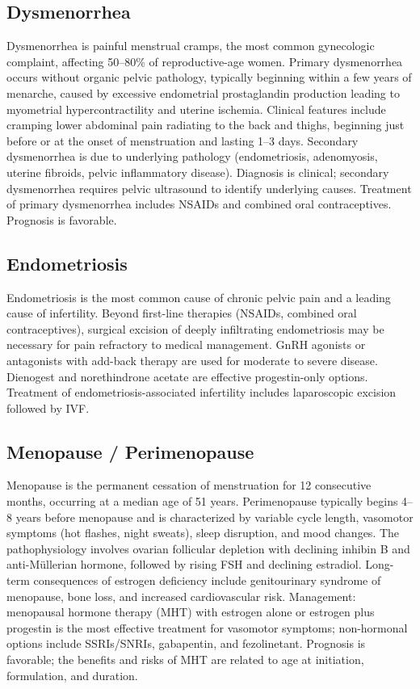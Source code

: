 \subsection{Dysmenorrhea}
\label{sec:Dysmenorrhea}
Dysmenorrhea is painful menstrual cramps, the most common gynecologic complaint, affecting 50--80\% of reproductive-age women. Primary dysmenorrhea occurs without organic pelvic pathology, typically beginning within a few years of menarche, caused by excessive endometrial prostaglandin production leading to myometrial hypercontractility and uterine ischemia. Clinical features include cramping lower abdominal pain radiating to the back and thighs, beginning just before or at the onset of menstruation and lasting 1--3 days. Secondary dysmenorrhea is due to underlying pathology (endometriosis, adenomyosis, uterine fibroids, pelvic inflammatory disease). Diagnosis is clinical; secondary dysmenorrhea requires pelvic ultrasound to identify underlying causes. Treatment of primary dysmenorrhea includes NSAIDs and combined oral contraceptives. Prognosis is favorable.

\subsection{Endometriosis}
\label{sec:obstetric:Endometriosis}
Endometriosis is the most common cause of chronic pelvic pain and a leading cause of infertility. Beyond first-line therapies (NSAIDs, combined oral contraceptives), surgical excision of deeply infiltrating endometriosis may be necessary for pain refractory to medical management. GnRH agonists or antagonists with add-back therapy are used for moderate to severe disease. Dienogest and norethindrone acetate are effective progestin-only options. Treatment of endometriosis-associated infertility includes laparoscopic excision followed by IVF.

\subsection{Menopause / Perimenopause}
\label{sec:Menopause}
Menopause is the permanent cessation of menstruation for 12 consecutive months, occurring at a median age of 51 years. Perimenopause typically begins 4--8 years before menopause and is characterized by variable cycle length, vasomotor symptoms (hot flashes, night sweats), sleep disruption, and mood changes. The pathophysiology involves ovarian follicular depletion with declining inhibin B and anti-M\"ullerian hormone, followed by rising FSH and declining estradiol. Long-term consequences of estrogen deficiency include genitourinary syndrome of menopause, bone loss, and increased cardiovascular risk. Management: menopausal hormone therapy (MHT) with estrogen alone or estrogen plus progestin is the most effective treatment for vasomotor symptoms; non-hormonal options include SSRIs/SNRIs, gabapentin, and fezolinetant. Prognosis is favorable; the benefits and risks of MHT are related to age at initiation, formulation, and duration.


